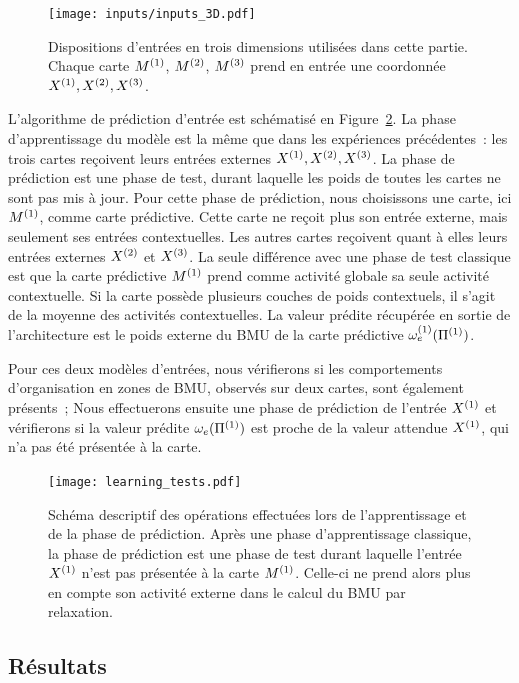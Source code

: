 \documentclass[../main]{subfiles}
\begin{document}
\begin{figure}[h!]
	\texttt{[image: inputs/inputs\_3D.pdf]}
	\caption{Dispositions d'entrées en trois dimensions utilisées dans cette partie. Chaque carte $M^{({1})}$, $M^{({2})}$, $M^{({3})}$ prend en entrée une coordonnée $X^{({1})}, X^{({2})}, X^{({3})}$. \label{fig:inputs_3D}}
\end{figure}

L'algorithme de prédiction d'entrée est schématisé en Figure~\ref{fig:schema_pred}.
La phase d'apprentissage du modèle est la même que dans les expériences précédentes~: les trois cartes reçoivent leurs entrées externes $X^{({1})},X^{({2})}, X^{({3})}$.
La phase de prédiction est une phase de test, durant laquelle les poids de toutes les cartes ne sont pas mis à jour.
Pour cette phase de prédiction, nous choisissons une carte, ici $M^{({1})}$, comme carte prédictive. 
Cette carte ne reçoit plus son entrée externe, mais seulement ses entrées contextuelles. 
Les autres cartes reçoivent quant à elles leurs entrées externes $X^{({2})}$ et $X^{({3})}$.
La seule différence avec une phase de test classique est que la carte prédictive $M^{({1})}$ prend comme activité globale sa seule activité contextuelle. Si la carte possède plusieurs couches de poids contextuels, il s'agit de la moyenne des activités contextuelles.
La valeur prédite récupérée en sortie de l'architecture est le poids externe du BMU de la carte prédictive $\omega_{e}^{({1})}(\Pi^{({1})})$.

Pour ces deux modèles d'entrées, nous vérifierons si les comportements d'organisation en zones de BMU, observés sur deux cartes, sont également présents~; 
Nous effectuerons ensuite une phase de prédiction de l'entrée $X^{({1})}$ et vérifierons si la valeur prédite $\omega_{e}(\Pi^{({1})})$ est proche de la valeur attendue $X^{({1})}$, qui n'a pas été présentée à la carte.

\begin{figure}
	\texttt{[image: learning\_tests.pdf]}
	\caption{Schéma descriptif des opérations effectuées lors de l'apprentissage et de la phase de prédiction. Après une phase d'apprentissage classique, la phase de prédiction est une phase de test durant laquelle l'entrée $X^{({1})}$ n'est pas présentée à la carte $M^{({1})}$. Celle-ci ne prend alors plus en compte son activité externe dans le calcul du BMU par relaxation. \label{fig:schema_pred}}
\end{figure}

\subsection{Résultats}
\end{document}
